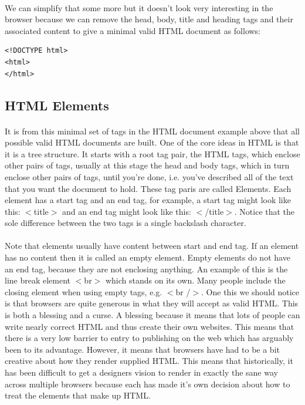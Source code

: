 \documentclass[10pt, a4paper, twosize]{article}
\begin{document}
\paragraph{} We can simplify that some more but it doesn't look very interesting in the browser because we can remove the head, body, title and heading tags and their associated content to give a minimal valid HTML document as follows:

\begin{lstlisting}
<!DOCTYPE html>
<html>
</html>
\end{lstlisting}

\subsection{HTML Elements}
\paragraph{} It is from this minimal set of tags in the HTML document example above that all possible valid HTML documents are built. One of the core ideas in HTML is that it is a tree structure. It starts with a root tag pair, the HTML tags, which enclose other pairs of tags, usually at this stage the head and body tags, which in turn enclose other pairs of tags, until you're done, i.e. you've described all of the text that you want the document to hold. These tag paris are called Elements. Each element has a start tag and an end tag, for example, a start tag might look like this: $<$title$>$ and an end tag might look like this: $<$/title$>$. Notice that the sole difference between the two tags is a single backslash character.

\paragraph{} Note that elements usually have content between start and end tag. If an element has no content then it is called an empty element. Empty elements do not have an end tag, because they are not enclosing anything. An example of this is the line break element $<$br$>$ which stands on its own. Many people include the closing element when using empty tags, e.g. $<$br /$>$. One this we should notice is that browsers are quite generous in what they will accept as valid HTML. This is both a blessing and a curse. A blessing because it means that lots of people can write nearly correct HTML and thus create their own websites. This means that there is a very low barrier to entry to publishing on the web which has arguably been to its advantage. However, it means that browsers have had to be a bit creative about how they render supplied HTML. This means that historically, it has been difficult to get a designers vision to render in exactly the sane way across multiple browsers because each has made it's own decision about how to treat the elements that make up HTML.
\end{document}
